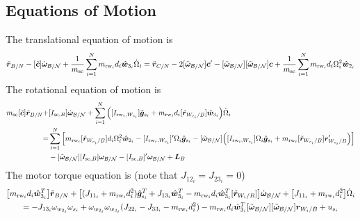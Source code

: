 \documentclass[]{BasiliskReportMemo}
\begin{document}
\subsection{Equations of Motion}
The translational equation of motion is
\begin{equation}
	\ddot{\bm r}_{B/N} -[\tilde{\bm{c}}]\dot{\bm\omega}_{\cal B/N} +\frac{1}{m_{\text{sc}}}\sum\limits_{i=1}^{N}m_{\text{rw}_i}d_i\hat{\bm{w}}_{3_i}\dot{\Omega}_i = \ddot{\bm r}_{C/N}   - 2[\tilde{\bm\omega}_{\cal B/N}]\bm{c}'-[\tilde{\bm\omega}_{\cal B/N}][\tilde{\bm\omega}_{\cal B/N}]\bm{c} + \frac{1}{m_{\text{sc}}}\sum\limits_{i=1}^{N}m_{\text{rw}_i}d_i\Omega_i^2\hat{\bm{w}}_{2_i}
	\label{eq:rBddot}
\end{equation}
The rotational equation of motion is
\begin{equation}
	\begin{split}
		m_{\text{sc}}[\tilde{\bm c}]\ddot{\bm r}_{B/N} +& [I_{\text{sc},B}]\dot{\bm\omega}_{\cal B/N} +\sum\limits_{i=1}^{N}\Big([I_{\text{rw}_i,W_{c_i}}]\hat{\bm{g}}_{s_i} + m_{\text{rw}_i}d_i[\tilde{\bm{r}}_{W_{c_i}/B}]\hat{\bm{w}}_{3_i}\Big)\dot{\Omega}_i
		\\=& 
		\sum\limits_{i=1}^{N}\Big[ m_{\text{rw}_i}[\tilde{\bm{r}}_{W_{c_i}/B}]d_i \Omega_i^2\hat{\bm{w}}_{2_i}-[I_{\text{rw}_i,W_{c_i}}]'\Omega_i \hat{\bm{g}}_{s_i} -[\tilde{\bm\omega}_{\cal B/N}]\Big([I_{\text{rw}_i,W_{c_i}}]\Omega_i \hat{\bm{g}}_{s_i}+ m_{\text{rw}_i}[\tilde{\bm{r}}_{W_{c_i}/B}]\bm{r}'_{W_{c_i}/B}\Big)\Big]
		\\&  -[\tilde{\bm\omega}_{\cal B/N}][I_{\text{sc},B}]\bm\omega_{\cal B/N}-  [I_{\text{sc},B}]'\bm\omega_{\cal B/N} + \bm{L}_B
	\end{split}
	\label{eq:rotationalEOM}
\end{equation}
The motor torque equation is (note that $J_{12_i} = J_{23_i} = 0$)
\begin{multline}
	\big[m_{\text{rw}_i} d_i \hat{\bm{w}}_{3_i}^T\big]\ddot{\bm{r}}_{B/N} + \big[(J_{11_i} + m_{\text{rw}_i} d_i^2)\hat{\bm g}_{\text{s}_i}^T  + J_{13_i}\hat{\bm w}_{3_i}^T -m_{\text{rw}_i} d_i \hat{\bm{w}}_{3_i}^T [\tilde{\bm r}_{W_i/B}]\big]\dot{\bm\omega}_{\cal B/N} + \big[J_{11_i} + m_{\text{rw}_i} d_i^2\big]\dot{\Omega}_i
	\\=   - J_{13_i} \omega_{w_{2_i}}\omega_{s_i}  
	+ \omega_{w_{2_i}} \omega_{w_{3_i}} (J_{22_i} - J_{33_i} - m_{\text{rw}_i} d_i^2
	) 
	 -m_{\text{rw}_i} d_i \hat{\bm{w}}_{3_i}^T [\tilde{\bm\omega}_{\cal B/N}] [\tilde{\bm\omega}_{\cal B/N}] \bm r_{W_i/B} + u_{s_i}
	\label{eq:motorTorqueFinal}
\end{multline}
\end{document}
